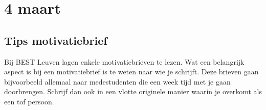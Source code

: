 \section{4 maart}
\subsection{Tips motivatiebrief}
Bij BEST Leuven lagen enkele motivatiebrieven te lezen. Wat een belangrijk aspect is bij een motivatiebrief is te weten naar wie je schrijft. Deze brieven gaan bijvoorbeeld allemaal naar medestudenten die een week tijd met je gaan doorbrengen. Schrijf dan ook in een vlotte originele manier waarin je overkomt als een tof persoon.
